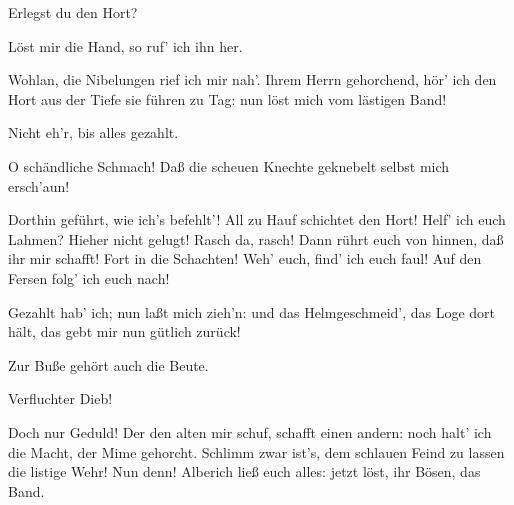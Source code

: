 \begin{drama}
\Wotanspeaks
Erlegst du den Hort?
 

\Alberichspeaks
Löst mir die Hand, so ruf' ich ihn her.
 



Wohlan, die Nibelungen rief ich mir nah'.
Ihrem Herrn gehorchend, hör' ich den Hort
aus der Tiefe sie führen zu Tag:
nun löst mich vom lästigen Band!
 

\Wotanspeaks
Nicht eh'r, bis alles gezahlt.
 




\Alberichspeaks
O schändliche Schmach!
Daß die scheuen Knechte
geknebelt selbst mich ersch'aun!
 



Dorthin geführt, wie ich's befehlt'!
All zu Hauf schichtet den Hort!
Helf' ich euch Lahmen?
Hieher nicht gelugt!
Rasch da, rasch!
Dann rührt euch von hinnen,
daß ihr mir schafft!
Fort in die Schachten!
Weh' euch, find' ich euch faul!
Auf den Fersen folg' ich euch nach!
 



Gezahlt hab' ich;
nun laßt mich zieh'n:
und das Helmgeschmeid',
das Loge dort hält,
das gebt mir nun gütlich zurück!
 

\Logespeaks


Zur Buße gehört auch die Beute.
 

\Alberichspeaks
Verfluchter Dieb!
 



Doch nur Geduld!
Der den alten mir schuf, schafft einen andern:
noch halt' ich die Macht, der Mime gehorcht.
Schlimm zwar ist's, dem schlauen Feind
zu lassen die listige Wehr!
Nun denn! Alberich ließ euch alles:
jetzt löst, ihr Bösen, das Band.
 

\Logespeaks


\end{drama}
